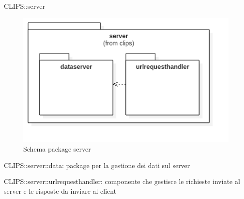 \begin{componente}{CLIPS::server}
\begin{figure}[h!]
\centering
\includegraphics[scale=0.5]{img/package/png/server.png}
\caption{Schema package server}
 \end{figure}
\begin{compPackageContenuti}
\item CLIPS::server::data: package per la gestione dei dati sul server
\item CLIPS::server::urlrequesthandler: componente che gestisce le richieste inviate al server e le risposte da inviare al client
\end{compPackageContenuti}
\end{componente}
